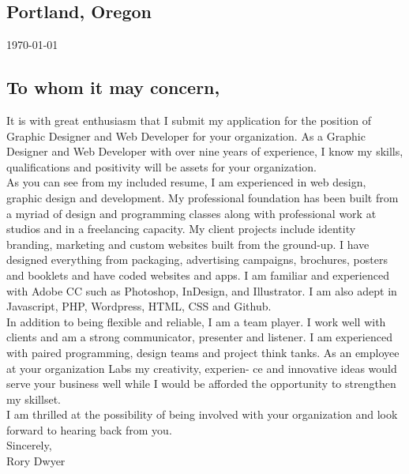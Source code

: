 \documentclass[]{deedy-resume-openfont}
\begin{document}
%
%

%
%
\begin{minipage}[t]{0.26\textwidth} 
\sectionsep
\sectionsep
\sectionsep
\subsection{Portland, Oregon}
\today

\end{minipage}
\hfill
\begin{minipage}[t]{0.66\textwidth}
\begin{flushleft}
{\color{blue}


\sectionsep
\sectionsep
\sectionsep
\subsection{To whom it may concern,}
\sectionsep

 It is with great enthusiasm that I submit my application for the position of Graphic Designer and Web Developer for your organization. As a Graphic Designer and Web Developer with over nine years of experience, I know my skills, qualifications and positivity will be assets for your organization. \\
\sectionsep
As you can see from my included resume, I am experienced in web design, graphic design and development. My professional foundation has been built from a myriad of design and programming classes along with professional work at studios and in a freelancing capacity. My client projects include identity branding, marketing and custom websites built from the ground-up. I have designed everything from packaging, advertising campaigns, brochures, posters and booklets and have coded websites and apps. I am familiar and experienced with Adobe CC such as
Photoshop, InDesign, and Illustrator. I am also adept in Javascript, PHP, Wordpress, HTML, CSS and Github. \\
\sectionsep
In addition to being flexible and reliable, I am a team player. I work well with clients and am a strong communicator, presenter and listener. I am experienced with paired programming, design teams and project think tanks. As an employee at your organization Labs my creativity, experien- ce and innovative ideas would serve your business well while I would be afforded the opportunity to strengthen my skillset. \\
I am thrilled at the possibility of being involved with your organization and look forward to hearing back from you. \\
\sectionsep
Sincerely, \\
Rory Dwyer \\
}
\end{flushleft}
\end{minipage}
\newpage
\end{document}
